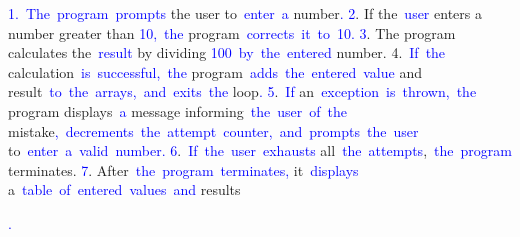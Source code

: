 \documentclass{article}
\begin{document}
\begin{tcolorbox}[colframe=black,colback=white]
{{}\textcolor{blue}{1}\textcolor{blue}{.}\textcolor{blue}{~The}\textcolor{blue}{~program}\textcolor{blue}{~prompts} the user to\textcolor{blue}{~enter}\textcolor{blue}{~a} number\textcolor{blue}{.
}\textcolor{blue}{2}. If the\textcolor{blue}{~user} enters a number greater than \textcolor{blue}{10}\textcolor{blue}{,}\textcolor{blue}{~the} program\textcolor{blue}{~correct}\textcolor{blue}{s}\textcolor{blue}{~it}\textcolor{blue}{~to}\textcolor{blue}{~}\textcolor{blue}{10}\textcolor{blue}{.
}\textcolor{blue}{3}. The program calculates the\textcolor{blue}{~result} by dividing \textcolor{blue}{100}\textcolor{blue}{~by}\textcolor{blue}{~the}\textcolor{blue}{~entered} number.
4.\textcolor{blue}{~If}\textcolor{blue}{~the} calculation\textcolor{blue}{~is}\textcolor{blue}{~successful}\textcolor{blue}{,}\textcolor{blue}{~the} program\textcolor{blue}{~adds}\textcolor{blue}{~the}\textcolor{blue}{~entered}\textcolor{blue}{~value} and result\textcolor{blue}{~to}\textcolor{blue}{~the}\textcolor{blue}{~arrays}\textcolor{blue}{,}\textcolor{blue}{~and}\textcolor{blue}{~exits}\textcolor{blue}{~the} loop\textcolor{blue}{.
}\textcolor{blue}{5}.\textcolor{blue}{~If} an\textcolor{blue}{~exception}\textcolor{blue}{~is}\textcolor{blue}{~thrown}\textcolor{blue}{,}\textcolor{blue}{~the} program displays\textcolor{blue}{~a} message informing\textcolor{blue}{~the}\textcolor{blue}{~user}\textcolor{blue}{~of}\textcolor{blue}{~the} mistake\textcolor{blue}{,}\textcolor{blue}{~decre}\textcolor{blue}{ments}\textcolor{blue}{~the}\textcolor{blue}{~attempt}\textcolor{blue}{~counter}\textcolor{blue}{,}\textcolor{blue}{~and}\textcolor{blue}{~prompts}\textcolor{blue}{~the}\textcolor{blue}{~user} to\textcolor{blue}{~enter}\textcolor{blue}{~a}\textcolor{blue}{~valid}\textcolor{blue}{~number}\textcolor{blue}{.
}\textcolor{blue}{6}.\textcolor{blue}{~If}\textcolor{blue}{~the}\textcolor{blue}{~user}\textcolor{blue}{~exhaust}\textcolor{blue}{s} all\textcolor{blue}{~the}\textcolor{blue}{~attempts},\textcolor{blue}{~the}\textcolor{blue}{~program} terminates.
\textcolor{blue}{7}. After\textcolor{blue}{~the}\textcolor{blue}{~program}\textcolor{blue}{~terminates}\textcolor{blue}{,} it\textcolor{blue}{~displays} a\textcolor{blue}{~table}\textcolor{blue}{~of}\textcolor{blue}{~entered}\textcolor{blue}{~values}\textcolor{blue}{~and} results\textcolor{blue}{.

}}
\end{tcolorbox}
\end{document}
